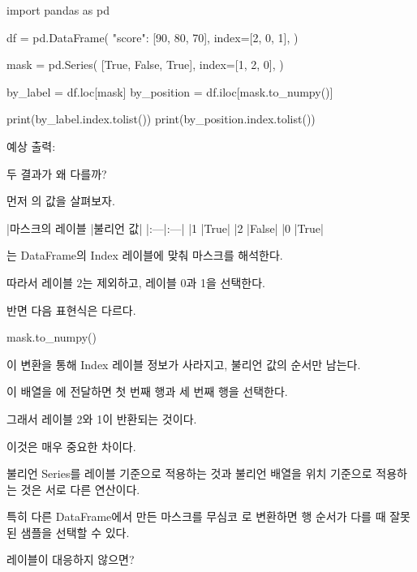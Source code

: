 \begin{dhkcode}
import pandas as pd

df = pd.DataFrame(
    {"score": [90, 80, 70]},
    index=[2, 0, 1],
)

mask = pd.Series(
    [True, False, True],
    index=[1, 2, 0],
)

by_label = df.loc[mask]
by_position = df.iloc[mask.to_numpy()]

print(by_label.index.tolist())
print(by_position.index.tolist())
\end{dhkcode}

예상 출력:

\begin{dhkzsh}
[0, 1]
[2, 1]
\end{dhkzsh}

두 결과가 왜 다를까?

먼저 의 값을 살펴보자.

\begin{dhktable}
|마스크의 레이블	|불리언 값|
|:---|:---|
|1	|True|
|2	|False|
|0	|True|
\end{dhktable}

는 DataFrame의 Index 레이블에 맞춰 마스크를 해석한다.

따라서 레이블 2는 제외하고, 레이블 0과 1을 선택한다.

반면 다음 표현식은 다르다.

\begin{dhkcode}
mask.to_numpy()
\end{dhkcode}

이 변환을 통해 Index 레이블 정보가 사라지고, 불리언 값의 순서만 남는다.

\begin{dhkzsh}
\end{dhkzsh}

이 배열을 에 전달하면 첫 번째 행과 세 번째 행을 선택한다.

그래서 레이블 2와 1이 반환되는 것이다.

이것은 매우 중요한 차이다.

불리언 Series를 레이블 기준으로 적용하는 것과 불리언 배열을 위치 기준으로 적용하는 것은 서로 다른 연산이다.

특히 다른 DataFrame에서 만든 마스크를 무심코 로 변환하면 행 순서가 다를 때 잘못된 샘플을 선택할 수 있다.

\begin{dhknote}
\begin{dhksmry}[centered]
레이블이 대응하지 않으면?
\end{dhksmry}
\end{dhknote}

